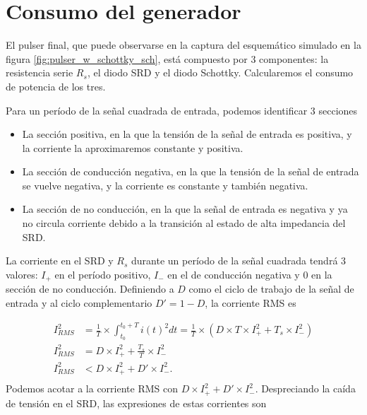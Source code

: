 \section{Consumo del generador}
\label{sec:pulser_power}

El pulser final, que puede observarse en la captura del esquemático simulado en
la figura \ref{fig:pulser_w_schottky_sch}, está compuesto por 3 componentes: la
resistencia serie $R_s$, el diodo SRD y el diodo Schottky. Calcularemos el
consumo de potencia de los tres.

Para un período de la señal cuadrada de entrada, podemos identificar 3 secciones

\begin{itemize}
    \item La sección positiva, en la que la tensión de la señal de entrada es
        positiva, y la corriente la aproximaremos constante y positiva.
    \item La sección de conducción negativa, en la que la tensión de la señal de
        entrada se vuelve negativa, y la corriente es constante y también
        negativa.
    \item La sección de no conducción, en la que la señal de entrada es
        negativa y ya no circula corriente debido a la transición al estado de
        alta impedancia del SRD.
\end{itemize}

La corriente en el SRD y $R_s$ durante un período de la señal cuadrada tendrá 3
valores: $I_+$ en el período positivo, $I_-$ en el de conducción negativa y $0$
en la sección de no conducción. Definiendo a $D$ como el ciclo de trabajo de la
señal de entrada y al ciclo complementario $D'=1-D$, la corriente RMS es

\begin{equation}
    \begin{aligned}
        I_{RMS}^2 &= \frac{1}{T} \times \int_{t_0}^{t_0+T} i(t)^2dt = \frac{1}{T}
        \times \left( D \times T \times I_+^2 + T_s \times I_-^2 \right) \\
        I_{RMS}^2 &= D \times I_+^2 + \frac{T_s}{T} \times I_-^2 \\
        I_{RMS}^2 &< D \times I_+^2 + D' \times I_-^2. \\
    \end{aligned}
\end{equation}
Podemos acotar a la corriente RMS con $D \times I_+^2 + D' \times I_-^2$.
Despreciando la caída de tensión en el SRD, las expresiones de estas corrientes son

